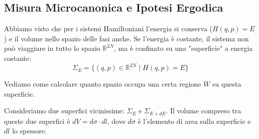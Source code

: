 \documentclass[openany]{book}
\theoremstyle{definition}
\theoremstyle{remark}
\newcommand{\R}{\mathbb{R}}
\begin{document}
\begin{center}
\end{center}


\subsection{Misura Microcanonica e Ipotesi Ergodica}

Abbiamo visto che per i sistemi Hamiltoniani l'energia si conserva ($H(q,p) = E$) e il volume nello spazio delle fasi anche.
Se l'energia è costante, il sistema non può viaggiare in tutto lo spazio $\R^{2N}$, ma è confinato su una "superficie" a energia costante:
\begin{equation*}
    \Sigma_E = \{ (q,p) \in \R^{2N} \mid H(q,p) = E \}
\end{equation*}

Vediamo come calcolare quanto spazio occupa una certa regione $W$ su questa superficie.

Consideriamo due superfici vicinissime: $\Sigma_E$ e $\Sigma_{E+dE}$.
Il volume compreso tra queste due superfici è $dV = d\sigma \cdot dl$, dove $d\sigma$ è l'elemento di area sulla superficie e $dl$ lo spessore.
\end{document}

